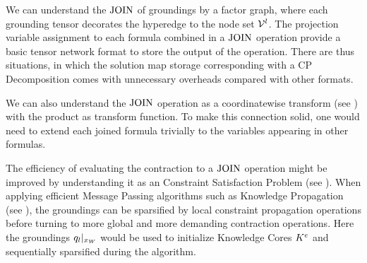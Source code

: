We can understand the $\mathrm{JOIN}$ of groundings by a factor graph, where each grounding tensor decorates the hyperedge to the node set $\mathcal{V}^{l}$.
The projection variable assignment to each formula combined in a $\mathrm{JOIN}$ operation provide a basic tensor network format to store the output of the operation.
There are thus situations, in which the solution map storage corresponding with a CP Decomposition comes with unnecessary overheads compared with other formats.

We can also understand the $\mathrm{JOIN}$ operation as a coordinatewise transform (see ) with the product as transform function.
To make this connection solid, one would need to extend each joined formula trivially to the variables appearing in other formulas.

The efficiency of evaluating the contraction to a $\mathrm{JOIN}$ operation might be improved by understanding it as an Constraint Satisfaction Problem (see ).
When applying efficient Message Passing algorithms such as Knowledge Propagation (see ), the groundings can be sparsified by local constraint propagation operations before turning to more global and more demanding contraction operations.
Here the groundings ${q_{l}}|_{x_{W}}$ would be used to initialize Knowledge Cores $K^{e}$ and sequentially sparsified during the algorithm.




